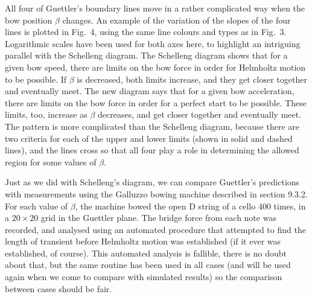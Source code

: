   All four of Guettler's boundary lines move in a rather complicated way when 
  the bow position $\beta$ changes. An example of the variation of the slopes 
  of the four lines is plotted in Fig.\ 4, using the same line colours and 
  types as in Fig.\ 3. Logarithmic scales have been used for both axes here, to 
  highlight an intriguing parallel with the Schelleng diagram. The Schelleng 
  diagram shows that for a given bow speed, there are limits on the bow force 
  in order for Helmholtz motion to be possible. If $\beta$ is decreased, both 
  limits increase, and they get closer together and eventually meet. The new 
  diagram says that for a given bow acceleration, there are limits on the bow 
  force in order for a perfect start to be possible. These limits, too, 
  increase as $\beta$ decreases, and get closer together and eventually meet. 
  The pattern is more complicated than the Schelleng diagram, because there are 
  two criteria for each of the upper and lower limits (shown in solid and 
  dashed lines), and the lines cross so that all four play a role in 
  determining the allowed region for some values of $\beta$. 


  Just as we did with Schelleng's diagram, we can compare Guettler's 
  predictions with measurements using the Galluzzo bowing machine described in 
  section 9.3.2. For each value of $\beta$, the machine bowed the open D string 
  of a cello 400 times, in a $20\times 20$ grid in the Guettler plane. The 
  bridge force from each note was recorded, and analysed using an automated 
  procedure that attempted to find the length of transient before Helmholtz 
  motion was established (if it ever was established, of course). This 
  automated analysis is fallible, there is no doubt about that, but the same 
  routine has been used in all cases (and will be used again when we come to 
  compare with simulated results) so the comparison between cases should be 
  fair. 

